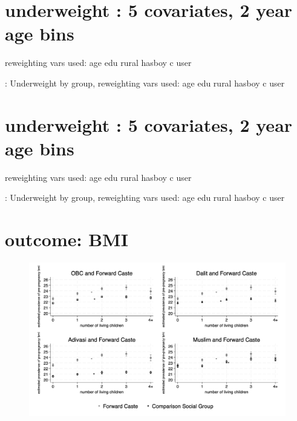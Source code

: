 \documentclass{article}
\begin{document}
\newpage 
\section{underweight : 5 covariates, 2 year age bins }

reweighting vars used: age edu rural hasboy c user

\begin{table}[H]
    \centering
    \footnotesize %
    \caption{: Underweight by group, reweighting vars used: age edu rural hasboy c user}
    \label{tab:sumstat}
\end{table}


\newpage 
\section{underweight : 5 covariates, 2 year age bins }

reweighting vars used: age edu rural hasboy c user

\begin{table}[H]
    \centering
    \footnotesize %
    \caption{: Underweight by group, reweighting vars used: age edu rural hasboy c user}
    \label{tab:sumstat}
\end{table}



\section{outcome: BMI}
\begin{figure}[H]
    \centering
    \includegraphics[width=\textwidth]{figures/prepreg_bmi_combined.png}
\end{figure}
\end{document}
